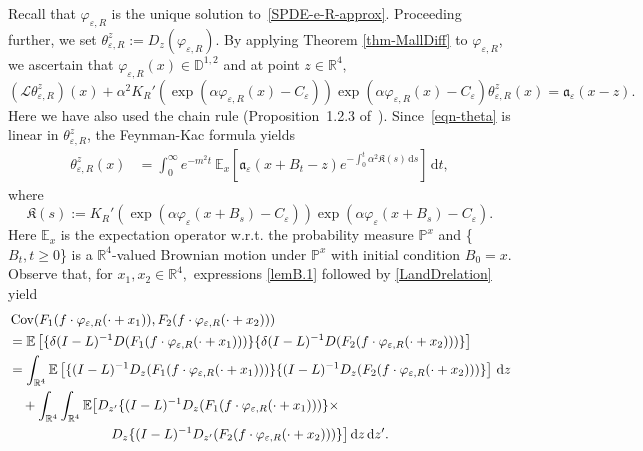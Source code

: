 \documentclass{article}
\newcommand{\assign}{:=}
\newcommand{\mathd}{\mathrm{d}}
\newcommand{\tmop}[1]{\ensuremath{\operatorname{#1}}}
\begin{document}
Recall that $\varphi_{\varepsilon, R}$ is the unique solution
to~\eqref{SPDE-e-R-approx}. Proceeding further, we set $\theta_{\varepsilon, R}^z \assign D_z (\varphi_{\varepsilon, R})$. By applying Theorem \ref{thm-MallDiff} to $\varphi_{\varepsilon, R}$, we ascertain that $\varphi_{\varepsilon, R} (x) \in \mathbb{D}^{1, 2}$ and at point $z \in\mathbb{R}^4,$
%
\begin{equation}
  (\mathcal{L} \theta_{\varepsilon, R}^z) (x) + \alpha^2 K_R' (\exp (\alpha
  \varphi_{\varepsilon, R} (x) - C_{\varepsilon})) \exp (\alpha
  \varphi_{\varepsilon, R} (x) - C_{\varepsilon}) \theta_{\varepsilon, R}^z
  (x) =\mathfrak{a}_{\varepsilon} (x - z) . \label{eqn-theta}
\end{equation}
Here we have also used the chain rule (Proposition~1.2.3
of~{\cite{Nualart2006}}). Since~\eqref{eqn-theta} is linear in
$\theta_{\varepsilon, R}^z$, the Feynman-Kac formula yields
%
\begin{align}
	\theta_{\varepsilon, R}^z  (x) & = \int_0^{\infty} e^{- m^2 t} ~ \mathbb{E}_x
	\left[\mathfrak{a}_{\varepsilon} (x + B_t - z)  e^{- \int_0^t \alpha^2 \mathfrak{K} (s)  \, \mathd s}
	\right] \, \mathd t, \label{FK}
\end{align}
% 
where
\[ 
     \mathfrak{K} (s) \assign K_R' (\exp (\alpha \varphi_{\varepsilon} (x +
     B_s) - C_{\varepsilon})) \exp (\alpha \varphi_{\varepsilon} (x + B_s) -
     C_{\varepsilon}) .
    \]
%
Here $\mathbb{E}_x$ is the expectation operator w.r.t. the probability
measure $\mathbb{P}^x$ and  \{$B_t, t \geqslant 0$\}  is a
$\mathbb{R}^4$-valued Brownian motion under $\mathbb{P}^x$ with initial
condition $B_0 = x$. Observe that, for $x_1, x_2 \in \mathbb{R}^4,$
expressions \eqref{lemB.1} followed by \eqref{LandDrelation} yield
%
\begin{align}
		& \tmop{Cov} (F_1 (f \cdot \varphi_{\varepsilon, R} (\cdot + x_1)), F_2
		(f \cdot \varphi_{\varepsilon, R} (\cdot + x_2))) \nonumber \\
		& =  \mathbb{E} \left[\{ \delta (I - L)^{- 1} D (F_1 (f \cdot
		\varphi_{\varepsilon, R} (\cdot + x_1))) \} \{ \delta (I - L)^{- 1} D (F_2
		(f \cdot \varphi_{\varepsilon, R} (\cdot + x_2))) \} \right] \nonumber\\
		& = \int_{\mathbb{R}^4} \mathbb{E} \left[\{ (I - L)^{- 1} D_z  (F_1 (f \cdot
		\varphi_{\varepsilon, R} (\cdot + x_1))) \} \{ (I - L)^{- 1} D_z  (F_2 (f
		\cdot \varphi_{\varepsilon, R} (\cdot + x_2))) \} \right] \, \mathd z\\
		& \quad + \int_{\mathbb{R}^4} \int_{\mathbb{R}^4} \mathbb{E} \big[D_{z'} \{ (I -
		L)^{- 1} D_z  (F_1 (f \cdot \varphi_{\varepsilon, R} (\cdot + x_1))) \} \times \nonumber \\
		& \qquad \hspace{2 cm}
		D_z \{ (I - L)^{- 1} D_{z'}  (F_2 (f \cdot \varphi_{\varepsilon, R} (\cdot
		+ x_2))) \} \big] \, \mathd z \, \mathd z' .
	 \label{covExpression}
\end{align}
\end{document}
